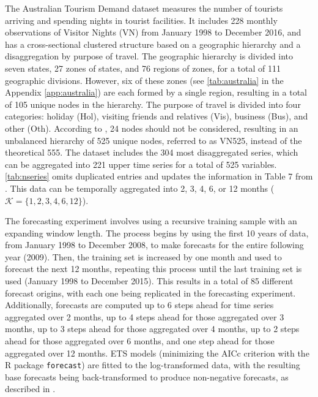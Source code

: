 \documentclass[a4paper,11pt]{article}
\theoremstyle{definition}
\begin{document}
The Australian Tourism Demand dataset \citep{wickramasuriya2019, wickramasuriya2020} measures the number of tourists arriving and spending nights in tourist facilities. It includes 228 monthly observations of Visitor Nights (VN) from January 1998 to December 2016, and has a cross-sectional clustered structure based on a geographic hierarchy and a disaggregation by purpose of travel. The geographic hierarchy is divided into seven states, 27 zones of states, and 76 regions of zones, for a total of 111 geographic divisions. However, six of these zones (see \autoref{tab:australia} in the Appendix \ref{app:australia}) are each formed by a single region, resulting in a total of 105 unique nodes in the hierarchy. The purpose of travel is divided into four categories: holiday (Hol), visiting friends and relatives (Vis), business (Bus), and other (Oth). According to \cite{difonzo2022a}, 24 nodes should not be considered, resulting in an unbalanced hierarchy of 525 unique nodes, referred to as VN525, instead of the theoretical 555. The dataset includes the 304 most disaggregated series, which can be aggregated into 221 upper time series for a total of 525 variables. \autoref{tab:nseries} omits duplicated entries and updates the information in Table 7 from \cite{wickramasuriya2019}. This data can be temporally aggregated into 2, 3, 4, 6, or 12 months ($\mathcal{K} = \{1,2,3,4,6,12\}$).

The forecasting experiment involves using a recursive training sample with an expanding window length. The process begins by using the first 10 years of data, from January 1998 to December 2008, to make forecasts for the entire following year (2009). Then, the training set is increased by one month and used to forecast the next 12 months, repeating this process until the last training set is used (January 1998 to December 2015). This results in a total of 85 different forecast origins, with each one being replicated in the forecasting experiment. Additionally, forecasts are computed up to 6 steps ahead for time series aggregated over 2 months, up to 4 steps ahead for those aggregated over 3 months, up to 3 steps ahead for those aggregated over 4 months, up to 2 steps ahead for those aggregated over 6 months, and one step ahead for those aggregated over 12 months. ETS models (minimizing the AICc criterion with the R package \texttt{forecast}) are fitted to the log-transformed data, with the resulting base forecasts being back-transformed to produce non-negative forecasts, as described in \cite{wickramasuriya2020}.
\end{document}
